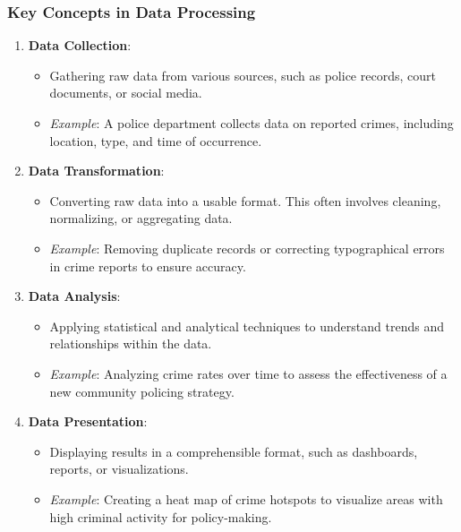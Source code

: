 \documentclass[aspectratio=169]{beamer}
\begin{document}
\begin{frame}
    \frametitle{Key Concepts in Data Processing}
    \begin{enumerate}
        \item \textbf{Data Collection}:
        \begin{itemize}
            \item Gathering raw data from various sources, such as police records, court documents, or social media.
            \item \textit{Example}: A police department collects data on reported crimes, including location, type, and time of occurrence.
        \end{itemize}
        
        \item \textbf{Data Transformation}:
        \begin{itemize}
            \item Converting raw data into a usable format. This often involves cleaning, normalizing, or aggregating data.
            \item \textit{Example}: Removing duplicate records or correcting typographical errors in crime reports to ensure accuracy.
        \end{itemize}
        
        \item \textbf{Data Analysis}:
        \begin{itemize}
            \item Applying statistical and analytical techniques to understand trends and relationships within the data.
            \item \textit{Example}: Analyzing crime rates over time to assess the effectiveness of a new community policing strategy.
        \end{itemize}

        \item \textbf{Data Presentation}:
        \begin{itemize}
            \item Displaying results in a comprehensible format, such as dashboards, reports, or visualizations.
            \item \textit{Example}: Creating a heat map of crime hotspots to visualize areas with high criminal activity for policy-making.
        \end{itemize}
    \end{enumerate}
\end{frame}
\end{document}
